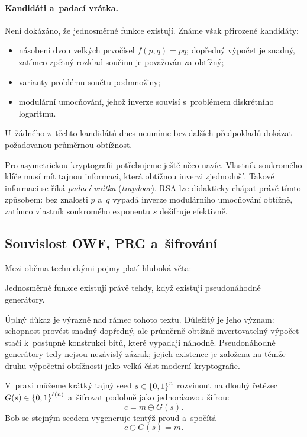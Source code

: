 
\paragraph{Kandidáti a~padací vrátka.}

Není dokázáno, že jednosměrné funkce existují. Známe však přirozené kandidáty:
\begin{itemize}
    \item násobení dvou velkých prvočísel $f(p,q)=pq$; dopředný výpočet je snadný, zatímco zpětný rozklad součinu je považován za obtížný;
    \item varianty problému součtu podmnožiny;
    \item modulární umocňování, jehož inverze souvisí s~problémem diskrétního logaritmu.
\end{itemize}
U~žádného z~těchto kandidátů dnes neumíme bez dalších předpokladů dokázat požadovanou průměrnou obtížnost.

Pro asymetrickou kryptografii potřebujeme ještě něco navíc. Vlastník soukromého klíče musí mít tajnou informaci, která obtížnou inverzi zjednoduší. Takové informaci se říká \emph{padací vrátka} (\emph{trapdoor}). RSA lze didakticky chápat právě tímto způsobem: bez znalosti $p$ a~$q$ vypadá inverze modulárního umocňování obtížně, zatímco vlastník soukromého exponentu $s$ dešifruje efektivně.

\subsection{Souvislost OWF, PRG a~šifrování}

Mezi oběma technickými pojmy platí hluboká věta:
\begin{theorem}
    Jednosměrné funkce existují právě tehdy, když existují pseudonáhodné generátory.
\end{theorem}
Úplný důkaz je výrazně nad rámec tohoto textu. Důležitý je jeho význam: schopnost provést snadný dopředný, ale průměrně obtížně invertovatelný výpočet stačí k~postupné konstrukci bitů, které vypadají náhodně. Pseudonáhodné generátory tedy nejsou nezávislý zázrak; jejich existence je založena na témže druhu výpočetní obtížnosti jako velká část moderní kryptografie.

V~praxi můžeme krátký tajný seed $s\in\left\{0,1\right\}^{n}$ rozvinout na dlouhý řetězec $G(s)\in\left\{0,1\right\}^{\ell(n)}$ a~šifrovat podobně jako jednorázovou šifrou:
\[
    c=m\oplus G(s).
\]
Bob se stejným seedem vygeneruje tentýž proud a~spočítá
\[
    c\oplus G(s)=m.
\]

